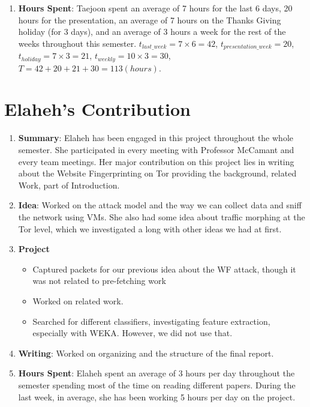 \documentclass{article}
\begin{document}
\begin{enumerate}
\item
{\bf Hours Spent}: Taejoon spent an average of 7 hours for the last 6 days, 20 hours for the presentation, an average of 7 hours on the Thanks Giving holiday (for 3 days), and an average of 3 hours a week for the rest of the weeks throughout this semester.
$t_{\mathit{last\_week}} = 7 \times 6 = 42$,
$t_{\mathit{presentation\_week}} = 20$,
$t_{\mathit{holiday}} = 7 \times 3 = 21$,
$t_{\mathit{weekly}} = 10 \times 3 = 30$,
$T = 42 + 20 + 21 + 30 = 113 (hours)$.
\end{enumerate}


\section{Elaheh's Contribution}

\begin{enumerate}
\item
{\bf Summary}:
Elaheh has been engaged in this project throughout the whole semester.
She participated in every meeting with Professor McCamant and every team meetings.
Her major contribution on this project lies in writing about the Website Fingerprinting on Tor providing the background, related Work, part of Introduction.
\item
{\bf Idea}: Worked on the attack model and the way we can collect data and sniff the network using VMs. She also had some idea about traffic morphing at the Tor level, which we investigated a long with other ideas we had at first.
\item
{\bf Project}
\begin{itemize}
\item
Captured packets for our previous idea about the WF attack, though it was not related to pre-fetching work
\item
Worked on related work.
\item
Searched for different classifiers, investigating feature extraction, especially with WEKA. However, we did not use that.
\end{itemize}
\item
{\bf Writing}: Worked on organizing and the structure of the final report.
\item
{\bf Hours Spent}: Elaheh spent an average of 3 hours per day throughout the semester spending most of the time on reading different papers. During the last week, in average, she has been working 5 hours per day on the project.
\end{enumerate}
\end{document}
